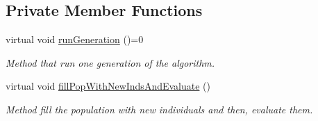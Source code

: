 \subsection*{Private Member Functions}
\begin{DoxyCompactItemize}
\item 
virtual void \mbox{\hyperlink{classEA_ab5586c481933e063694c45d487757c82}{run\+Generation}} ()=0
\begin{DoxyCompactList}\small\item\em Method that run one generation of the algorithm. \end{DoxyCompactList}\item 
virtual void \mbox{\hyperlink{classEA_ae99a3c887d3014a59bce9501add80308}{fill\+Pop\+With\+New\+Inds\+And\+Evaluate}} ()
\begin{DoxyCompactList}\small\item\em Method fill the population with new individuals and then, evaluate them. \end{DoxyCompactList}\end{DoxyCompactItemize}
